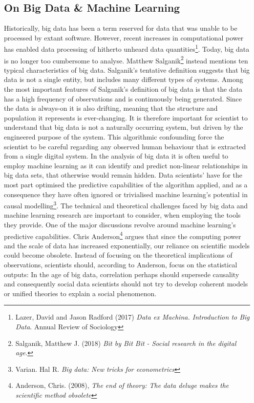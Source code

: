 \documentclass[12pt,a4paper]{article}
\begin{document}
\subsection{On Big Data \& Machine Learning}
Historically, big data has been a term reserved for data that was unable to be processed by extant software. However, recent increases in computational power has enabled data processing of hitherto unheard data quantities\footnote{Lazer, David and Jason Radford (2017) \textit{Data ex Machina. Introduction to Big Data}. Annual Review of Sociology}. Today, big data is no longer too cumbersome to analyse. Matthew Salganik\footnote{Salganik, Matthew J. (2018) \textit{Bit by Bit Bit - Social research in the digital age.}} instead mentions ten typical characteristics of big data. Salganik's tentative definition suggests that big data is not a single entity, but includes many different types of systems. Among the most important features of Salganik's definition of big data is that the data has a high frequency of observations and is continuously being generated. Since the data is always-on it is also drifting, meaning that the structure and population it represents is ever-changing. It is therefore important for scientist to understand that big data is not a naturally occurring system, but driven by the engineered purpose of the system. This algorithmic confounding force the scientist to be careful regarding any observed human behaviour that is extracted from a single digital system.\newline
In the analysis of big data it is often useful to employ machine learning as it can identify and predict non-linear relationships in big data sets, that otherwise would remain hidden. Data scientists' have for the most part optimised the predictive capabilities of the algorithm applied, and as a consequence they have often ignored or trivialised machine learning's potential in causal modelling\footnote{Varian. Hal R. \textit{Big data: New tricks for econometrics}}.\newline
The technical and theoretical challenges faced by big data and machine learning research are important to consider, when employing the tools they provide. One of the major discussions revolve around machine learning's predictive capabilities. Chris Anderson\footnote{Anderson, Chris. (2008), \textit{The end of theory: The data deluge makes the scientific method obsolete}} argues that since the computing power and the scale of data has increased exponentially, our reliance on scientific models could become obsolete. Instead of focusing on the theoretical implications of observations, scientists should, according to Anderson, focus on the statistical outputs: In the age of big data, correlation perhaps should supersede causality and consequently social data scientists should not try to develop coherent models or unified theories to explain a social phenomenon.\newline
\end{document}

